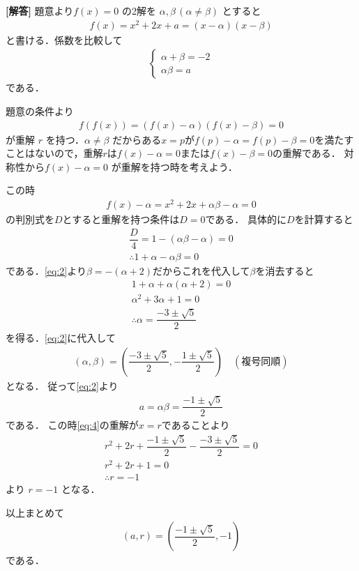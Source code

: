 \documentclass[../../main.tex]{subfiles}
\begin{document}
\begin{oframed}
  
\end{oframed}

{\bf [解答]}
題意より$f(x)=0$ の2解を $\alpha,\beta\, (\alpha\neq\beta)$ とすると
\begin{align}
  f(x) = x^2+2x+a = (x-\alpha)(x-\beta) \label{eq:1}
\end{align}
と書ける．係数を比較して
\begin{align}
  \begin{cases}
    \alpha+\beta = -2 \\
    \alpha\beta = a
  \end{cases} \label{eq:2}
\end{align}
である．

題意の条件より
\begin{align}
  f(f(x))=(f(x)-\alpha)(f(x)-\beta)=0 \label{eq:3}
\end{align}
が重解 $r$ を持つ．$\alpha\ne\beta$ だからある$x=p$が$f(p)-\alpha=f(p)-\beta=0$を満たすことはないので，重解$r$は$f(x)-\alpha=0$または$f(x)-\beta=0$の重解である．
対称性から$f(x)-\alpha=0$ が重解を持つ時を考えよう．

この時
\begin{align}
  f(x)-\alpha=x^2+2x+\alpha\beta-\alpha=0 \label{eq:4}
\end{align}
の判別式を$D$とすると重解を持つ条件は$D=0$である．
具体的に$D$を計算すると
\begin{align}
  \dfrac{D}{4}=1-(\alpha\beta-\alpha)=0 \\
  \therefore
  1+\alpha-\alpha\beta=0
\end{align}
である．\cref{eq:2}より$\beta=-(\alpha+2)$だからこれを代入して$\beta$を消去すると
\begin{align}
  1+\alpha+\alpha(\alpha+2)=0 \\
  \alpha^2+3\alpha+1=0 \\
  \therefore
  \alpha=\dfrac{-3\pm\sqrt{5}}{2}
\end{align}
を得る．\cref{eq:2}に代入して
\begin{align}
  (\alpha,\beta)=\left(\dfrac{-3\pm\sqrt{5}}{2},-\dfrac{1\pm\sqrt{5}}{2}\right) \quad (\text{複号同順})
\end{align}
となる．
従って\cref{eq:2}より
\begin{align}
  a=\alpha\beta=\dfrac{-1\pm\sqrt{5}}{2} \label{eq:5}
\end{align}
である．
この時\cref{eq:4}の重解が$x=r$であることより
\begin{align}
  r^2+2r+\dfrac{-1\pm\sqrt{5}}{2}-\dfrac{-3\pm\sqrt{5}}{2} = 0 \\
  r^2+2r+1=0 \\
  \therefore r = -1
\end{align}
より $r=-1$ となる．

以上まとめて
\begin{align}
  (a,r) = \left(\dfrac{-1\pm\sqrt{5}}{2}, -1\right)
\end{align}
である．

\newpage
\end{document}
